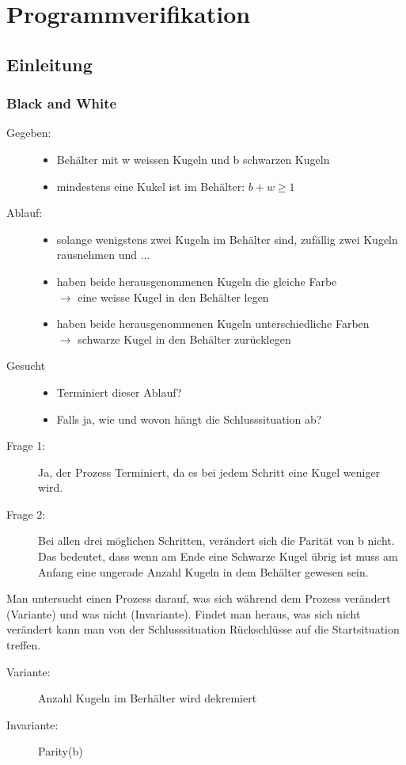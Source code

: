 \documentclass[a4paper,10pt]{article}
\begin{document}
\newpage
\section{Programmverifikation}
\subsection{Einleitung}
\subsubsection{Black and White}
\begin{description}
	\item[Gegeben:] \hfill
		\begin{itemize}
			\item Beh\"alter mit w weissen Kugeln und b schwarzen Kugeln
			\item mindestens eine Kukel ist im Beh\"alter: $b + w \geq 1$
		\end{itemize}
	\item[Ablauf:] \hfill
		\begin{itemize}
			\item solange wenigstens zwei Kugeln im Beh\"alter sind, zuf\"allig zwei Kugeln rausnehmen und ...
			\item haben beide herausgenommenen Kugeln die gleiche Farbe \\
				$\rightarrow$ eine weisse Kugel in den Beh\"alter legen
			\item haben beide herausgenommenen Kugeln unterschiedliche Farben \\
				$\rightarrow$ schwarze Kugel in den Beh\"alter zur\"ucklegen
		\end{itemize}
	\item[Gesucht] \hfill
		\begin{itemize}
			\item Terminiert dieser Ablauf?
			\item Falls ja, wie und wovon h\"angt die Schlusssituation ab?
		\end{itemize}
\end{description}

\begin{description}
	\item[Frage 1:] Ja, der Prozess Terminiert, da es bei jedem Schritt eine Kugel weniger wird.
	\item[Frage 2:] Bei allen drei m\"oglichen Schritten, ver\"andert sich die Parit\"at von b nicht. Das bedeutet, dass wenn am Ende eine Schwarze Kugel \"ubrig ist muss am Anfang eine ungerade Anzahl Kugeln in dem Beh\"alter gewesen sein.
\end{description}
Man untersucht einen Prozess darauf, was sich w\"ahrend dem Prozess ver\"andert (Variante) und was nicht (Invariante). Findet man heraus, was sich nicht ver\"andert kann man von der Schlusssituation R\"uckschl\"usse auf die Startsituation treffen.
\begin{description}
	\item[Variante:] Anzahl Kugeln im Berh\"alter wird dekremiert
	\item[Invariante:] Parity(b)
\end{description}
\end{document}
